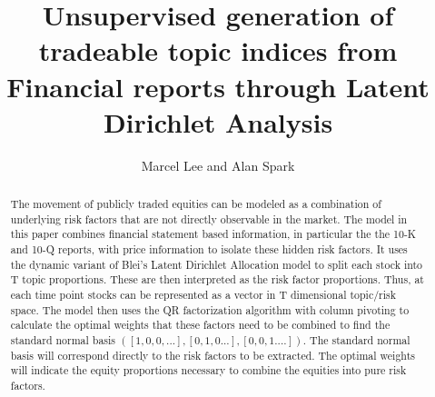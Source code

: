 \documentclass[12pt,journal,letterpaper,oneside,onecolumn]{IEEEtran}
\begin{document}
%
\title{Unsupervised generation of tradeable topic indices from Financial reports through Latent Dirichlet Analysis}

\author{
Marcel Lee
and Alan Spark%
}



\maketitle

\begin{abstract}
The movement of publicly traded equities can be modeled as a combination of 
underlying risk factors that are not directly observable in the market. The  model in this paper combines financial statement based information, in particular the the 10-K and 10-Q reports, with price information to isolate these hidden risk factors.
It uses the dynamic variant of Blei's Latent Dirichlet Allocation model to split each stock into T topic proportions. These are then interpreted as the risk factor proportions.
Thus, at each time point stocks can be represented as a vector in T dimensional topic/risk space.
The model then uses the QR factorization algorithm with column pivoting to calculate the optimal weights that these factors need to be combined to find the standard normal basis $([1,0,0,...], [0,1,0...], [0,0,1....])$.
The standard normal basis will correspond directly to the risk factors to be extracted. The optimal weights will indicate the equity proportions necessary to combine the equities into pure risk factors.
\end{abstract}
\end{document}
